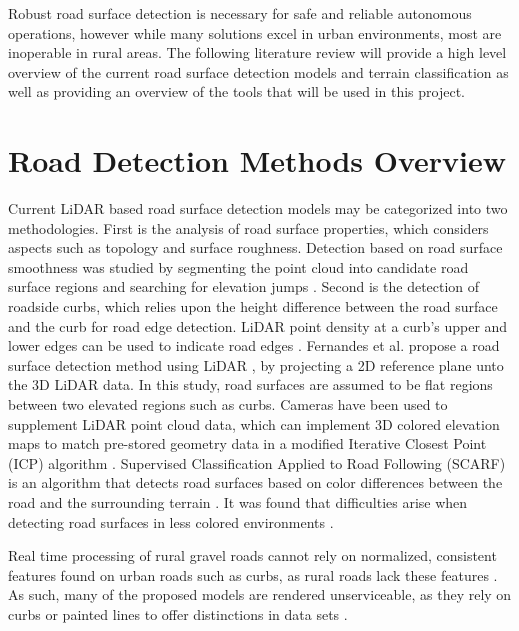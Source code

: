 \documentclass[numbered,pdftex]{ohio-etd}
\begin{document}
{		{Robust road surface detection is necessary for safe and reliable autonomous operations, however while many solutions excel in urban environments, most are inoperable in rural areas. The following literature review will provide a high level overview of the current road surface detection models and terrain classification as well as providing an overview of the tools that will be used in this project.}
		
	\section{Road Detection Methods Overview}{
	
		{Current LiDAR based road surface detection models may be categorized into two methodologies. First is the analysis of road surface properties, which considers aspects such as topology and surface roughness. Detection based on road surface smoothness was studied by segmenting the point cloud into candidate road surface regions and searching for elevation jumps \cite{liu_new_2013}. Second is the detection of roadside curbs, which relies upon the height difference between the road surface and the curb for road edge detection. LiDAR point density at a curb's upper and lower edges can be used to indicate road edges \cite{ibrahim_curb-based_2012}. Fernandes et al. propose a road surface detection method using LiDAR \cite{fernandes_road_2014}, by projecting a 2D reference plane unto the 3D LiDAR data. In this study, road surfaces are assumed to be flat regions between two elevated regions such as curbs. Cameras have been used to supplement LiDAR point cloud data, which can implement 3D colored elevation maps to match pre-stored geometry data in a modified Iterative Closest Point (ICP) algorithm \cite{manz_detection_2011}. Supervised Classification Applied to Road Following (SCARF) is an algorithm that detects road surfaces based on color differences between the road and the surrounding terrain \cite{crisman_scarf_1993}. It was found that difficulties arise when detecting road surfaces in less colored environments \cite{crisman_scarf_1993,manz_detection_2011}.}
		
		{Real time processing of rural gravel roads cannot rely on normalized, consistent features found on urban roads such as curbs, as rural roads lack these features \cite{skorseth_gravel_nodate}. As such, many of the proposed models are rendered unserviceable, as they rely on curbs or painted lines to offer distinctions in data sets \cite{yadav_extraction_2017,liu_new_2013,qiu_fast_2016,fernandes_road_2014,seker_experiments_nodate,yang_semi-automated_2013,miyazaki_line-based_2014,hervieu_road_2013,smadja_road_nodate}.} 
		
}}
\end{document}
